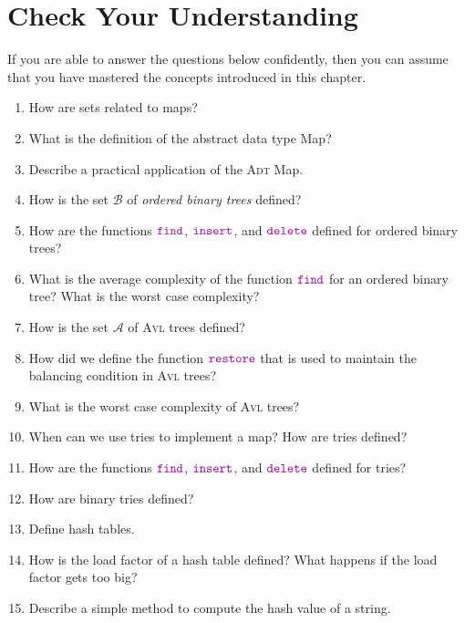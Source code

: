 \section{Check Your Understanding}
If you are able to answer the questions below confidently, then you can assume that you have mastered the concepts
introduced in this chapter.
\begin{enumerate}
\item How are sets related to maps?
\item What is the definition of the abstract data type Map?
\item Describe a practical application of the \textsc{Adt} Map.
\item How is the set $\mathcal{B}$ of \emph{ordered binary trees} defined?
\item How are the functions $\mytt{find}$, $\mytt{insert}$, and $\mytt{delete}$ defined for ordered
      binary trees?
\item What is the average complexity of the function $\mytt{find}$ for an ordered binary tree?
      What is the worst case complexity?
\item How is the set $\mathcal{A}$ of \textsc{Avl} trees defined?
\item How did we define the function $\mytt{restore}$ that is used to maintain the balancing condition
      in \textsc{Avl} trees?
\item What is the worst case complexity of \textsc{Avl} trees?
\item When can we use tries to implement a map? How are tries defined?
\item How are the functions $\mytt{find}$, $\mytt{insert}$, and $\mytt{delete}$ defined for tries?
\item How are binary tries defined?
\item Define hash tables.
\item How is the load factor of a hash table defined?
      What happens if the load factor gets too big?
\item Describe a simple method to compute the hash value of a string.
\end{enumerate}

